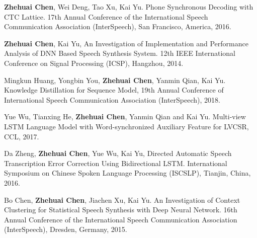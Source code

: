 \begin{publications}{99}
 \item {\bf Zhehuai Chen}, Wei Deng, Tao Xu, Kai Yu. Phone Synchronous Decoding with CTC Lattice. 17th Annual Conference of the International Speech Communication Association (InterSpeech), San Francisco, America, 2016.
 \item {\bf Zhehuai Chen}, Kai Yu, An Investigation of Implementation and Performance Analysis of DNN Based Speech Synthesis System. 12th IEEE International Conference on Signal Processing (ICSP), Hangzhou, 2014.
 \\
 \item Mingkun Huang, Yongbin You, {\bf Zhehuai Chen}, Yanmin Qian, Kai Yu. Knowledge Distillation for Sequence Model, 19th Annual Conference of  International Speech Communication Association (InterSpeech), 2018.
 \item Yue Wu, Tianxing He, {\bf Zhehuai Chen}, Yanmin Qian and Kai Yu. Multi-view LSTM Language Model with Word-synchronized Auxiliary Feature for LVCSR, CCL, 2017.
 \item Da Zheng, {\bf Zhehuai Chen}, Yue Wu, Kai Yu, Directed Automatic Speech Transcription Error Correction Using Bidirectional LSTM. International Symposium on Chinese Spoken Language Processing (ISCSLP), Tianjin, China, 2016.
 \item Bo Chen, {\bf Zhehuai Chen}, Jiachen Xu, Kai Yu. An Investigation of Context Clustering for Statistical Speech Synthesis with Deep Neural Network. 16th Annual Conference of the International Speech Communication Association (InterSpeech), Dresden, Germany, 2015.
\end{publications}
